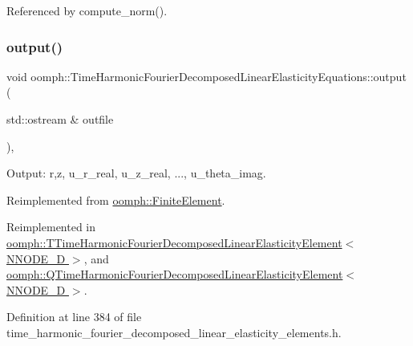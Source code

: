 Referenced by compute\+\_\+norm().

\mbox{\label{classoomph_1_1TimeHarmonicFourierDecomposedLinearElasticityEquations_a31a091df2b2e53d6998585c992c9e724}} 
\subsubsection{\texorpdfstring{output()}{output()}\hspace{0.1cm}{\footnotesize\ttfamily [1/4]}}
{\footnotesize\ttfamily void oomph\+::\+Time\+Harmonic\+Fourier\+Decomposed\+Linear\+Elasticity\+Equations\+::output (\begin{DoxyParamCaption}\item[{std\+::ostream \&}]{outfile }\end{DoxyParamCaption})\hspace{0.3cm}{\ttfamily [inline]}, {\ttfamily [virtual]}}



Output\+: r,z, u\+\_\+r\+\_\+real, u\+\_\+z\+\_\+real, ..., u\+\_\+theta\+\_\+imag. 



Reimplemented from \hyperlink{classoomph_1_1FiniteElement_a2ad98a3d2ef4999f1bef62c0ff13f2a7}{oomph\+::\+Finite\+Element}.



Reimplemented in \hyperlink{classoomph_1_1TTimeHarmonicFourierDecomposedLinearElasticityElement_ae14527add57636a4412ea584dd66cdbe}{oomph\+::\+T\+Time\+Harmonic\+Fourier\+Decomposed\+Linear\+Elasticity\+Element$<$ N\+N\+O\+D\+E\+\_\+D $>$}, and \hyperlink{classoomph_1_1QTimeHarmonicFourierDecomposedLinearElasticityElement_a8d2c88dba3a246693ba43bab9d84fbd8}{oomph\+::\+Q\+Time\+Harmonic\+Fourier\+Decomposed\+Linear\+Elasticity\+Element$<$ N\+N\+O\+D\+E\+\_\+D $>$}.



Definition at line 384 of file time\+\_\+harmonic\+\_\+fourier\+\_\+decomposed\+\_\+linear\+\_\+elasticity\+\_\+elements.\+h.




